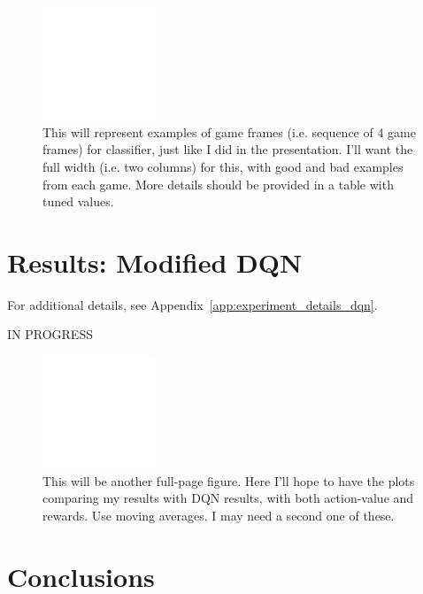 \documentclass[letterpaper, 10pt, conference]{ieeeconf}
\begin{document}
\begin{figure}[t]
\centering
\includegraphics[width=0.30\textwidth]{figures/empty.png}
\caption{\footnotesize
This will represent examples of game frames (i.e. sequence of 4 game frames) for
classifier, just like I did in the presentation. I'll want the full width (i.e.
two columns) for this, with good and bad examples from each game. More details
should be provided in a table with tuned values.
}
\label{fig:empty1}
\end{figure}



\section{Results: Modified DQN}\label{sec:results_p2}

For additional details, see Appendix~\ref{app:experiment_details_dqn}.

IN PROGRESS

\begin{figure}[t]
\centering
\includegraphics[width=0.30\textwidth]{figures/empty.png}
\caption{\footnotesize
This will be another full-page figure. Here I'll hope to have the plots
comparing my results with DQN results, with both action-value and rewards. Use
moving averages. I may need a second one of these.
}
\label{fig:empty2}
\end{figure}




\section{Conclusions}\label{sec:conclusions}
\end{document}
